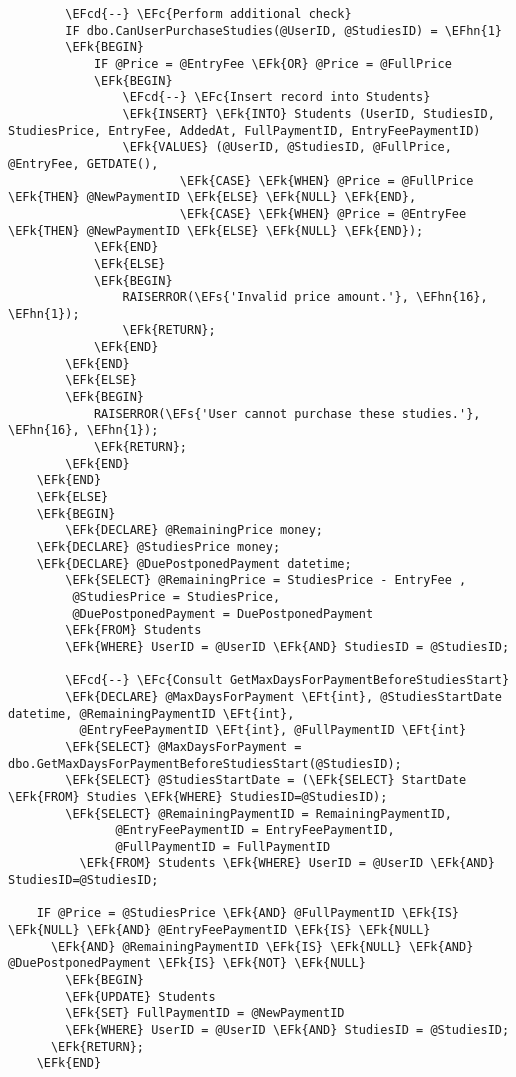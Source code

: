 \documentclass[11pt]{article}
\newcommand{\EFc}[1]{\textcolor{EFc}{\textit{#1}}} %
\newcommand{\EFcd}[1]{\textcolor{EFcd}{\textit{#1}}} %
\newcommand{\EFs}[1]{\textcolor{EFs}{#1}} %
\newcommand{\EFk}[1]{\textcolor{EFk}{\textbf{#1}}} %
\newcommand{\EFt}[1]{\textcolor{EFt}{\textbf{#1}}} %
\newcommand{\EFhn}[1]{\textcolor{EFhn}{#1}} %
\begin{document}
\begin{Code}
\begin{Verbatim}
        \EFcd{--} \EFc{Perform additional check}
        IF dbo.CanUserPurchaseStudies(@UserID, @StudiesID) = \EFhn{1}
        \EFk{BEGIN}
            IF @Price = @EntryFee \EFk{OR} @Price = @FullPrice
            \EFk{BEGIN}
                \EFcd{--} \EFc{Insert record into Students}
                \EFk{INSERT} \EFk{INTO} Students (UserID, StudiesID, StudiesPrice, EntryFee, AddedAt, FullPaymentID, EntryFeePaymentID)
                \EFk{VALUES} (@UserID, @StudiesID, @FullPrice, @EntryFee, GETDATE(),
                        \EFk{CASE} \EFk{WHEN} @Price = @FullPrice \EFk{THEN} @NewPaymentID \EFk{ELSE} \EFk{NULL} \EFk{END},
                        \EFk{CASE} \EFk{WHEN} @Price = @EntryFee \EFk{THEN} @NewPaymentID \EFk{ELSE} \EFk{NULL} \EFk{END});
            \EFk{END}
            \EFk{ELSE}
            \EFk{BEGIN}
                RAISERROR(\EFs{'Invalid price amount.'}, \EFhn{16}, \EFhn{1});
                \EFk{RETURN};
            \EFk{END}
        \EFk{END}
        \EFk{ELSE}
        \EFk{BEGIN}
            RAISERROR(\EFs{'User cannot purchase these studies.'}, \EFhn{16}, \EFhn{1});
            \EFk{RETURN};
        \EFk{END}
    \EFk{END}
    \EFk{ELSE}
    \EFk{BEGIN}
        \EFk{DECLARE} @RemainingPrice money;
    \EFk{DECLARE} @StudiesPrice money;
    \EFk{DECLARE} @DuePostponedPayment datetime;
        \EFk{SELECT} @RemainingPrice = StudiesPrice - EntryFee ,
         @StudiesPrice = StudiesPrice,
         @DuePostponedPayment = DuePostponedPayment
        \EFk{FROM} Students 
        \EFk{WHERE} UserID = @UserID \EFk{AND} StudiesID = @StudiesID;

        \EFcd{--} \EFc{Consult GetMaxDaysForPaymentBeforeStudiesStart}
        \EFk{DECLARE} @MaxDaysForPayment \EFt{int}, @StudiesStartDate datetime, @RemainingPaymentID \EFt{int},
          @EntryFeePaymentID \EFt{int}, @FullPaymentID \EFt{int}
        \EFk{SELECT} @MaxDaysForPayment = dbo.GetMaxDaysForPaymentBeforeStudiesStart(@StudiesID);
        \EFk{SELECT} @StudiesStartDate = (\EFk{SELECT} StartDate \EFk{FROM} Studies \EFk{WHERE} StudiesID=@StudiesID);
        \EFk{SELECT} @RemainingPaymentID = RemainingPaymentID,
               @EntryFeePaymentID = EntryFeePaymentID,
               @FullPaymentID = FullPaymentID
          \EFk{FROM} Students \EFk{WHERE} UserID = @UserID \EFk{AND} StudiesID=@StudiesID;

    IF @Price = @StudiesPrice \EFk{AND} @FullPaymentID \EFk{IS} \EFk{NULL} \EFk{AND} @EntryFeePaymentID \EFk{IS} \EFk{NULL}
      \EFk{AND} @RemainingPaymentID \EFk{IS} \EFk{NULL} \EFk{AND} @DuePostponedPayment \EFk{IS} \EFk{NOT} \EFk{NULL}
        \EFk{BEGIN}
        \EFk{UPDATE} Students 
        \EFk{SET} FullPaymentID = @NewPaymentID
        \EFk{WHERE} UserID = @UserID \EFk{AND} StudiesID = @StudiesID;	
      \EFk{RETURN};
    \EFk{END} 



\end{Verbatim}
\end{Code}
\end{document}
